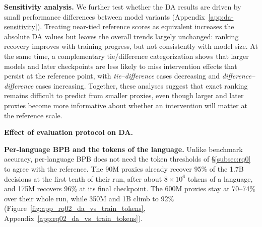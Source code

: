 \textbf{Sensitivity analysis.}
We further test whether the DA results are driven by small performance differences between model variants (Appendix~\ref{app:da-sensitivity}). Treating near-tied reference scores as equivalent increases the absolute DA values but leaves the overall trends largely unchanged: ranking recovery improves with training progress, but not consistently with model size. At the same time, a complementary tie/difference categorization shows that larger models and later checkpoints are less likely to miss intervention effects that persist at the reference point, with \emph{tie--difference} cases decreasing and \emph{difference--difference} cases increasing. Together, these analyses suggest that exact ranking remains difficult to predict from smaller proxies, even though larger and later proxies become more informative about whether an intervention will matter at the reference scale.


\textbf{Effect of evaluation protocol on DA.}


\textbf{Per-language BPB and the tokens of the language.}
Unlike benchmark accuracy, per-language BPB does not need the token thresholds of \S\ref{subsec:rq0} to agree with the reference. The 90M proxies already recover 95\% of the 1.7B decisions at the first tenth of their run, after about $8\times10^{6}$ tokens of a language, and 175M recovers 96\% at its final checkpoint. The 600M proxies stay at 70--74\% over their whole run, while 350M and 1B climb to 92\% (Figure~\ref{fig:app_rq02_da_vs_train_tokens}, Appendix~\ref{app:rq02_da_vs_train_tokens}).

